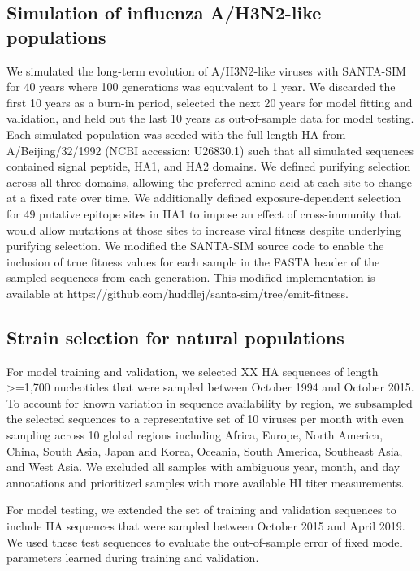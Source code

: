 \subsection*{Simulation of influenza A/H3N2-like populations}

We simulated the long-term evolution of A/H3N2-like viruses with SANTA-SIM \cite{Jariani2019} for 40 years where 100 generations was equivalent to 1 year.
We discarded the first 10 years as a burn-in period, selected the next 20 years for model fitting and validation, and held out the last 10 years as out-of-sample data for model testing.
Each simulated population was seeded with the full length HA from A/Beijing/32/1992 (NCBI accession: U26830.1) such that all simulated sequences contained signal peptide, HA1, and HA2 domains.
We defined purifying selection across all three domains, allowing the preferred amino acid at each site to change at a fixed rate over time.
We additionally defined exposure-dependent selection for 49 putative epitope sites in HA1 \cite{Luksza:2014hj} to impose an effect of cross-immunity that would allow mutations at those sites to increase viral fitness despite underlying purifying selection.
We modified the SANTA-SIM source code to enable the inclusion of true fitness values for each sample in the FASTA header of the sampled sequences from each generation.
This modified implementation is available at https://github.com/huddlej/santa-sim/tree/emit-fitness.

\subsection*{Strain selection for natural populations}

For model training and validation, we selected XX HA sequences of length >=1,700 nucleotides that were sampled between October 1994 and October 2015.
To account for known variation in sequence availability by region, we subsampled the selected sequences to a representative set of 10 viruses per month with even sampling across 10 global regions including Africa, Europe, North America, China, South Asia, Japan and Korea, Oceania, South America, Southeast Asia, and West Asia.
We excluded all samples with ambiguous year, month, and day annotations and prioritized samples with more available HI titer measurements.

For model testing, we extended the set of training and validation sequences to include HA sequences that were sampled between October 2015 and April 2019.
We used these test sequences to evaluate the out-of-sample error of fixed model parameters learned during training and validation.

